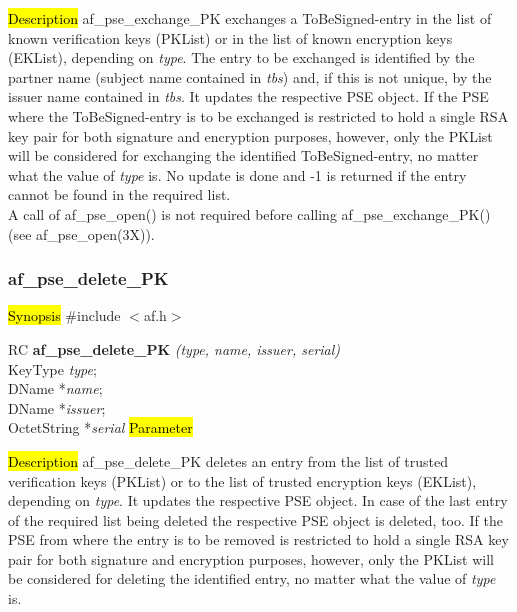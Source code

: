 
\hl{Description}
af\_pse\_exchange\_PK exchanges a ToBeSigned-entry in the list of known 
verification keys (PKList) or in the list of known encryption keys (EKList), depending
on {\em type}. The entry to be exchanged is identified by the partner name (subject name
contained in {\em tbs}) and, if this is not unique, by the issuer name contained in {\em tbs}.
It updates the respective PSE object.
If the PSE where the ToBeSigned-entry is to be exchanged is restricted to hold a single RSA key pair
for both signature and encryption purposes, however, only the PKList will be considered for exchanging the identified ToBeSigned-entry,
no matter what the value of {\em type} is.
No update is done and -1 is returned if
the entry cannot be found in the required list.
\\ [1em]
A call of af\_pse\_open() is not required before calling af\_pse\_exchange\_PK()
(see af\_pse\_open(3X)).

\subsubsection{af\_pse\_delete\_PK}
\label{af_del_PK}
\hl{Synopsis}
\#include $<$af.h$>$ 

RC {\bf af\_pse\_delete\_PK} {\em (type, name, issuer, serial)} \\
KeyType {\em type}; \\
DName *{\em name}; \\
DName *{\em issuer}; \\
OctetString *{\em serial}
\hl{Parameter}




\hl{Description}
af\_pse\_delete\_PK deletes an entry from the list of trusted 
verification keys (PKList) or to the list of trusted encryption keys (EKList), depending
on {\em type}. It updates the respective PSE object. In case of the last entry of the required
list being deleted the respective PSE object is deleted, too.
If the PSE from where the entry is to be removed is restricted to hold a single RSA key pair
for both signature and encryption purposes, however, only the PKList will be considered for deleting the identified entry,
no matter what the value of {\em type} is.


